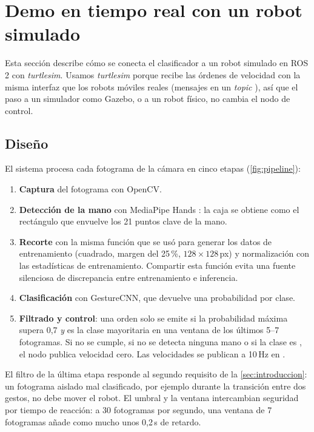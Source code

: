 \section{Demo en tiempo real con un robot simulado}
\label{sec:demo}

Esta sección describe cómo se conecta el clasificador a un robot simulado en ROS\,2
\citep{macenski2022ros2} con \emph{turtlesim}. Usamos \emph{turtlesim} porque recibe las órdenes
de velocidad con la misma interfaz que los robots móviles reales (mensajes  en un
\emph{topic} ), así que el paso a un simulador como Gazebo, o a un robot físico, no
cambia el nodo de control.

\subsection{Diseño}

El sistema procesa cada fotograma de la cámara en cinco etapas (\cref{fig:pipeline}):
\begin{enumerate}
  \item \textbf{Captura} del fotograma con OpenCV.
  \item \textbf{Detección de la mano} con MediaPipe Hands \citep{zhang2020mediapipe}: la caja se
    obtiene como el rectángulo que envuelve los 21 puntos clave de la mano.
  \item \textbf{Recorte} con la misma función  que se usó para generar los datos
    de entrenamiento (cuadrado, margen del 25\,\%, $128\times128$\,px) y normalización con las
    estadísticas de entrenamiento. Compartir esta función evita una fuente silenciosa de
    discrepancia entre entrenamiento e inferencia.
  \item \textbf{Clasificación} con GestureCNN, que devuelve una probabilidad por clase.
  \item \textbf{Filtrado y control}: una orden solo se emite si la probabilidad máxima supera
    0,7 \emph{y} es la clase mayoritaria en una ventana de los últimos 5--7 fotogramas. Si no se
    cumple, si no se detecta ninguna mano o si la clase es , el nodo publica
    velocidad cero. Las velocidades se publican a 10\,Hz en .
\end{enumerate}

El filtro de la última etapa responde al segundo requisito de la \cref{sec:introduccion}: un
fotograma aislado mal clasificado, por ejemplo durante la transición entre dos gestos, no debe
mover el robot. El umbral y la ventana intercambian seguridad por tiempo de reacción: a 30
fotogramas por segundo, una ventana de 7 fotogramas añade como mucho unos 0,2\,s de retardo.

